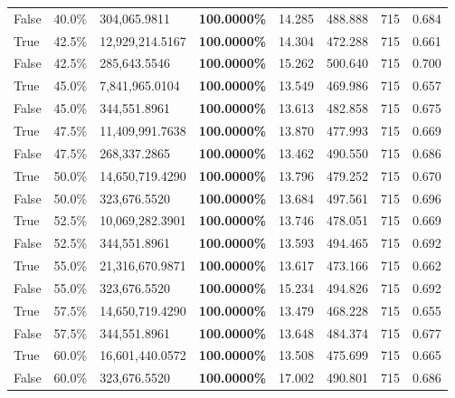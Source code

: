\begin{table}[H]
\begin{tabular}{lllrllll}
\cline{1-8}
False & 40.0\% & 304,065.9811 & \bfseries \color{red} 100.0000\% & 14.285 & 488.888 & 715 & 0.684 \\
\cline{1-8}
True & 42.5\% & 12,929,214.5167 & \bfseries \color{red} 100.0000\% & 14.304 & 472.288 & 715 & 0.661 \\
\cline{1-8}
False & 42.5\% & 285,643.5546 & \bfseries \color{red} 100.0000\% & 15.262 & 500.640 & 715 & 0.700 \\
\cline{1-8}
True & 45.0\% & 7,841,965.0104 & \bfseries \color{red} 100.0000\% & 13.549 & 469.986 & 715 & 0.657 \\
\cline{1-8}
False & 45.0\% & 344,551.8961 & \bfseries \color{red} 100.0000\% & 13.613 & 482.858 & 715 & 0.675 \\
\cline{1-8}
True & 47.5\% & 11,409,991.7638 & \bfseries \color{red} 100.0000\% & 13.870 & 477.993 & 715 & 0.669 \\
\cline{1-8}
False & 47.5\% & \color{red} 268,337.2865 & \bfseries \color{red} 100.0000\% & 13.462 & 490.550 & 715 & 0.686 \\
\cline{1-8}
True & 50.0\% & 14,650,719.4290 & \bfseries \color{red} 100.0000\% & 13.796 & 479.252 & 715 & 0.670 \\
\cline{1-8}
False & 50.0\% & 323,676.5520 & \bfseries \color{red} 100.0000\% & 13.684 & 497.561 & 715 & 0.696 \\
\cline{1-8}
True & 52.5\% & 10,069,282.3901 & \bfseries \color{red} 100.0000\% & 13.746 & 478.051 & 715 & 0.669 \\
\cline{1-8}
False & 52.5\% & 344,551.8961 & \bfseries \color{red} 100.0000\% & 13.593 & 494.465 & 715 & 0.692 \\
\cline{1-8}
True & 55.0\% & 21,316,670.9871 & \bfseries \color{red} 100.0000\% & 13.617 & 473.166 & 715 & 0.662 \\
\cline{1-8}
False & 55.0\% & 323,676.5520 & \bfseries \color{red} 100.0000\% & 15.234 & 494.826 & 715 & 0.692 \\
\cline{1-8}
True & 57.5\% & 14,650,719.4290 & \bfseries \color{red} 100.0000\% & 13.479 & 468.228 & 715 & 0.655 \\
\cline{1-8}
False & 57.5\% & 344,551.8961 & \bfseries \color{red} 100.0000\% & 13.648 & 484.374 & 715 & 0.677 \\
\cline{1-8}
True & 60.0\% & 16,601,440.0572 & \bfseries \color{red} 100.0000\% & 13.508 & 475.699 & 715 & 0.665 \\
\cline{1-8}
False & 60.0\% & 323,676.5520 & \bfseries \color{red} 100.0000\% & 17.002 & 490.801 & 715 & 0.686 \\

\end{tabular}
\end{table}
